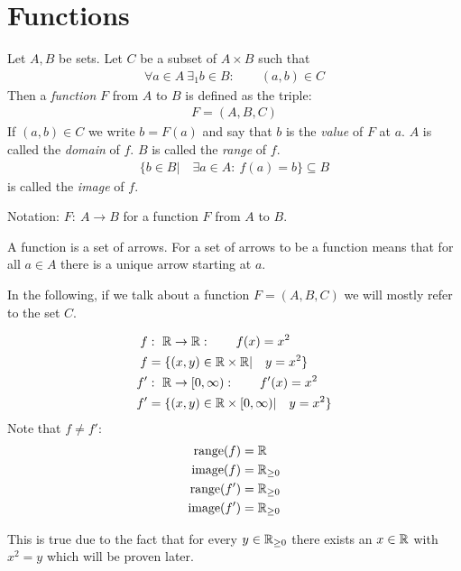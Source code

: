 \section{Functions}

\begin{df}
	Let $A,B$ be sets. Let $C$ be a subset of $A \times B$ such that 
	\begin{align*}
	\forall a \in A ~ \exists_1 b \in B: \qquad (a,b) \in C
	\end{align*} 
	Then a \emph{function} $F$ from $A$ to $B$ is defined as the triple:
	\begin{align*}
		F = (A,B,C)
	\end{align*}
	If $(a,b) \in C$ we write $b=F(a)$ and say that $b$ is the \emph{value} of $F$ at $a$.
	$A$ is called the \emph{domain} of $f$. $B$ is called the \emph{range} of $f$.
	\begin{align*}
	\{b \in B| \quad \exists a \in A:~ f(a) = b \} \subseteq B
	\end{align*}
	is called the \emph{image} of $f$.
	
	Notation: $F:~ A \to B$ for a function $F$ from $A$ to $B$.
\end{df}
A function is a set of arrows. For a set of arrows to be a function means that for all $a \in A$ there is a unique arrow starting at $a$.

\begin{rk}
	In the following, if we talk about a function $F=(A,B,C)$ we will mostly refer to the set $C$.
\end{rk}
	
\begin{ex}
	\begin{align*}
	f& :  ~ \mathbb R  \to \mathbb R: \qquad f(x) = x^2 \\
	f & = \{(x,y) \in \mathbb R \times \mathbb R| \quad y = x^2 \} \\
	f'& : ~\mathbb R  \to [0, \infty): \qquad f'(x) = x^2\\
	f' & = \{(x,y) \in \mathbb R \times [0, \infty)| \quad y = x^2 \}
	\end{align*}
	Note that $f \neq f'$:	
	\begin{align*}
	\operatorname{range}(f) & = \mathbb R \\
	\operatorname{image}(f) & = \mathbb R_{\ge 0} \\
	\operatorname{range}(f') & = \mathbb R_{\ge 0} \\
	\operatorname{image}(f') & = \mathbb R_{\ge 0}
	\end{align*}
\end{ex}

\begin{rk}
	This is true due to the fact that for every $y \in \mathbb R_{\ge 0}$ there exists an $x \in \mathbb R$ with $x^2 = y$ which will be proven later.
\end{rk}

